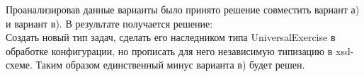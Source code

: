 Проанализировав данные варианты было принято решение совместить вариант а) и вариант в). В результате получается решение: \\
Создать новый тип задач, сделать его наследником типа UniversalExercise в обработке конфигурации, но прописать для него независимую типизацию в xsd-схеме. Таким образом единственный минус варианта в) будет решен.			
			













